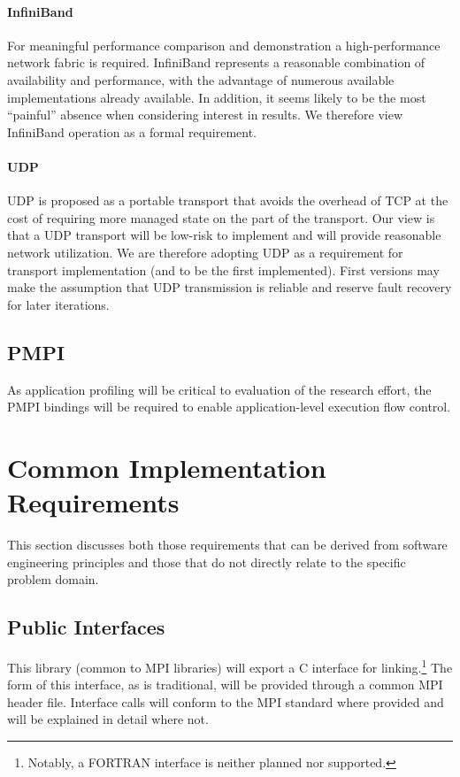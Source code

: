 \documentclass{article}
\begin{document}
\paragraph{InfiniBand}  For meaningful performance comparison and demonstration a high-performance network fabric is required.  InfiniBand represents a reasonable combination of availability and performance, with the advantage of numerous available implementations already available.  In addition, it seems likely to be the most ``painful'' absence when considering interest in results.  We therefore view InfiniBand operation as a formal requirement.

\paragraph{UDP} UDP is proposed as a portable transport that avoids the overhead of TCP at the cost of requiring more managed state on the part of the transport.  Our view is that a UDP transport will be low-risk to implement and will provide reasonable network utilization.  We are therefore adopting UDP as a requirement for transport implementation (and to be the first implemented).  First versions may make the assumption that UDP transmission is reliable and reserve fault recovery for later iterations.

\subsection{PMPI}

As application profiling will be critical to evaluation of the research effort, the PMPI bindings will be required to enable application-level execution flow control.

\section{Common Implementation Requirements}

This section discusses both those requirements that can be derived from software engineering principles and those that do not directly relate to the specific problem domain.

\subsection{Public Interfaces}

This library (common to MPI libraries) will export a C interface for linking.\footnote{Notably, a FORTRAN interface is neither planned nor supported.}  The form of this interface, as is traditional, will be provided through a common MPI header file.  Interface calls will conform to the MPI standard where provided and will be explained in detail where not.
\end{document}
